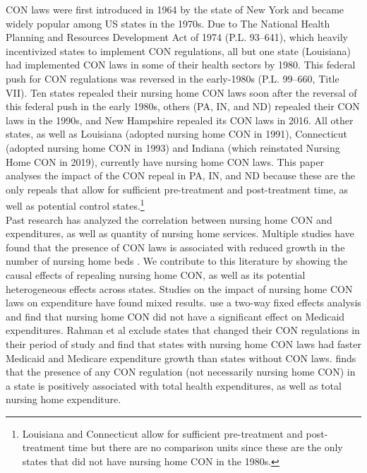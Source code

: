 \documentclass[../Main.tex]{subfiles}
\begin{document}
CON laws were first introduced in 1964 by the state of New York and became widely popular among US states in the 1970s. Due to The National Health Planning and Resources Development Act of 1974 (P.L. 93–641), which heavily incentivized states to implement CON regulations, all but one state (Louisiana) had implemented CON laws in some of their health sectors by 1980. This federal push for CON regulations was reversed in the early-1980s (P.L. 99–660, Title VII). Ten states repealed their nursing home CON laws soon after the reversal of this federal push in the early 1980s, others (PA, IN, and ND) repealed their CON laws in the 1990s, and New Hampshire repealed its CON laws in 2016. All other states, as well as Louisiana (adopted nursing home CON in 1991), Connecticut (adopted nursing home CON in 1993) and Indiana (which reinstated Nursing Home CON in 2019), currently have nursing home CON laws. This paper analyses the impact of the CON repeal in PA, IN, and ND because these are the only repeals that allow for sufficient pre-treatment and post-treatment time, as well as potential control states.\footnote{Louisiana and Connecticut allow for sufficient pre-treatment and post-treatment time but there are no comparison units since these are the only states that did not have nursing home CON in the 1980s.} \\
\indent Past research has analyzed the correlation between nursing home CON and expenditures, as well as quantity of nursing home services. Multiple studies have found that the presence of CON laws is associated with reduced growth in the number of nursing home beds \citep{harrington1997effect,swan1991certificate,zinn1994market}. We contribute to this literature by showing the causal effects of repealing nursing home CON, as well as its potential heterogeneous effects across states. Studies on the impact of nursing home CON laws on expenditure have found mixed results. \citet{grabowski2003effects} use a two-way fixed effects analysis and find that nursing home CON did not have a significant effect on Medicaid expenditures. Rahman et al \citet{rahman2016impact} exclude states that changed their CON regulations in their period of study and find that states with nursing home CON laws had faster Medicaid and Medicare expenditure growth than states without CON laws. \citet{bailey2019can} finds that the presence of any CON regulation (not necessarily nursing home CON) in a state is positively associated with total health expenditures, as well as total nursing home expenditure.\\
\end{document}
